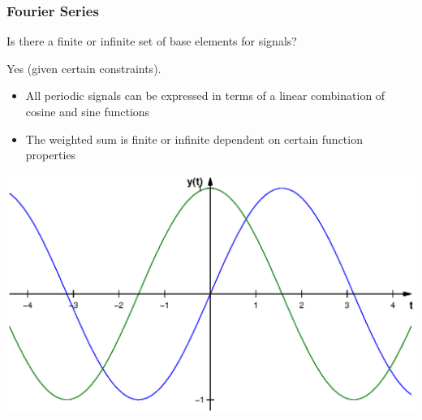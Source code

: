 \begin{frame}
    \frametitle{Fourier Series}

    \question Is there a finite or infinite set of base elements for signals?

    \answer Yes (given certain constraints).\newline

    \begin{itemize}
        \item All periodic signals can be expressed in terms of a linear combination of cosine and sine functions
        \item The weighted sum is finite or infinite dependent on certain function properties
    \end{itemize}

    \begin{center}
        \includegraphics[height=.45\textheight ]{images/functions}
    \end{center}
\end{frame}








